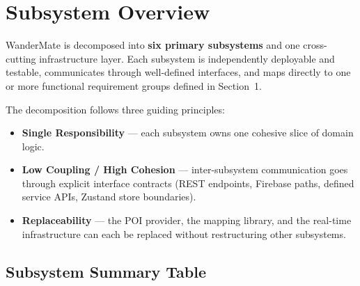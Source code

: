 \documentclass[12pt, a4paper]{article}
\begin{document}
\section{Subsystem Overview}

WanderMate is decomposed into \textbf{six primary subsystems} and one cross-cutting infrastructure layer. Each subsystem is independently deployable and testable, communicates through well-defined interfaces, and maps directly to one or more functional requirement groups defined in Section~1.

The decomposition follows three guiding principles:
\begin{itemize}
  \item \textbf{Single Responsibility} --- each subsystem owns one cohesive slice of domain logic.
  \item \textbf{Low Coupling / High Cohesion} --- inter-subsystem communication goes through explicit interface contracts (REST endpoints, Firebase paths, defined service APIs, Zustand store boundaries).
  \item \textbf{Replaceability} --- the POI provider, the mapping library, and the real-time infrastructure can each be replaced without restructuring other subsystems.
\end{itemize}

\subsection{Subsystem Summary Table}
\end{document}
